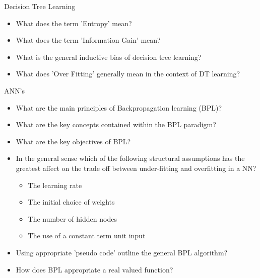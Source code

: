 \documentclass[%
pdf,
colorBG,
slideColor,
tcrico,
]{prosper}
\begin{document}

\begin{slide}{Decision Tree Learning} 
\begin{itemize}
\item What does the term 'Entropy' mean?
\item What does the term 'Information Gain' mean?
\item What is the general inductive bias of decision tree learning?
\item What does 'Over Fitting' generally mean in the context of DT learning?
\end{itemize}
\end{slide}

\begin{slide}{ANN's} 
\tiny
\begin{itemize}
\item What are the main principles of Backpropagation learning (BPL)?
\item What are the key concepts contained within the BPL  paradigm?
\item What are the key objectives of BPL?
\item In the general sense which of the following structural assumptions has the greatest affect on the trade off between under-fitting and overfitting in a NN?
\begin{itemize}
\item The learning rate
\item The initial choice of weights
\item The number of hidden nodes
\item The use of a constant term unit input
\end{itemize}
\item Using appropriate 'pseudo code' outline the general BPL algorithm?
\item How does BPL appropriate a real valued function?
\end{itemize}
\end{slide}
\end{document}

